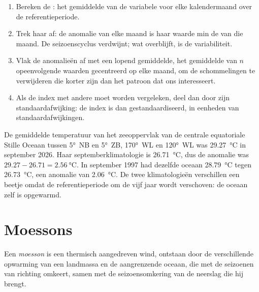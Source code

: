 \begin{method}\label{met:b2:climate-variability:index}
\begin{enumerate}
  \item Bereken de : het gemiddelde van de variabele voor elke kalendermaand over de
        referentieperiode.
  \item Trek haar af: de anomalie van elke maand is haar waarde min de  van die maand.
        De seizoenscyclus verdwijnt; wat overblijft, is de variabiliteit.
  \item Vlak de anomalieën af met een lopend gemiddelde, het gemiddelde van $n$ opeenvolgende waarden gecentreerd op
        elke maand, om de schommelingen te verwijderen die korter zijn dan het patroon dat ons interesseert.
  \item Als de index met andere moet worden vergeleken, deel dan door zijn standaardafwijking: de index
        is dan gestandaardiseerd, in eenheden van standaardafwijkingen.
\end{enumerate}
\end{method}

\begin{example}\label{ex:b2:climate-variability:anomaly}
De gemiddelde temperatuur van het zeeoppervlak van de centrale equatoriale Stille Oceaan tussen \ang{5}~NB en
\ang{5}~ZB, \ang{170}~WL en \ang{120}~WL was \qty{29.27}{\celsius} in september 2026. Haar
septemberklimatologie is \qty{26.71}{\celsius}, dus de anomalie was $29.27 - 26.71 = \qty{2.56}{\celsius}$.
In september 1997 had dezelfde oceaan \qty{28.79}{\celsius} tegen \qty{26.73}{\celsius}, een
anomalie van \qty{2.06}{\celsius}. De twee klimatologieën verschillen een beetje omdat de
referentieperiode om de vijf jaar wordt verschoven: de oceaan zelf is opgewarmd.
\end{example}

\section{Moessons}\label{sec:b2:climate-variability:monsoons}

\begin{definition}[Moesson]\label{def:b2:climate-variability:monsoon}
Een \emph{moesson} is een thermisch aangedreven wind, ontstaan door de verschillende opwarming van
een landmassa en de aangrenzende oceaan, die met de seizoenen van richting omkeert, samen met
de seizoensomkering van de neerslag die hij brengt.
\end{definition}

